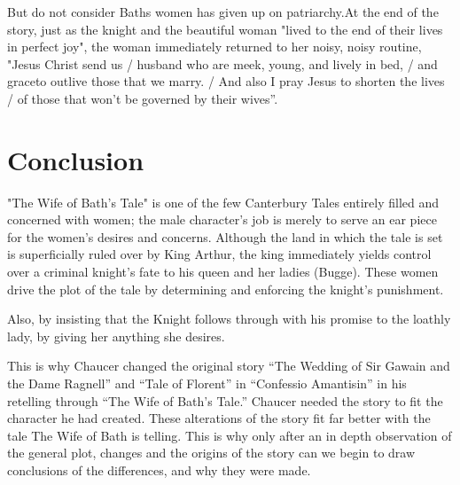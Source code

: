 But do not consider Baths women has given up on patriarchy.\cite{steinberg1964wife}At the end of the story, just as the knight and the beautiful woman "lived to the end of their lives in perfect joy", the woman immediately returned to her noisy, noisy routine, "Jesus Christ send us /  husband who are meek, young, and lively in bed, / and graceto outlive those that we marry. / And also I pray Jesus to shorten the lives / of those that won't be governed by their wives”.


\section{Conclusion}
\label{Conclusion}

"The Wife of Bath's Tale" is one of the few Canterbury Tales entirely filled and concerned with women; the male character's job is merely to serve an ear piece for the women's desires and concerns. Although the land in which the tale is set is superficially ruled over by King Arthur, the king immediately yields control over a criminal knight's fate to his queen and her ladies (Bugge). These women drive the plot of the tale by determining and enforcing the knight's punishment. 

Also, by insisting that the Knight follows through with his promise to the loathly lady, by giving her anything she desires.

This is why Chaucer changed the original story “The Wedding of Sir Gawain and the Dame Ragnell” and “Tale of Florent” in “Confessio Amantisin” in his retelling through “The Wife of Bath’s Tale.” Chaucer needed the story to fit the character he had created. These alterations of the story fit far better with the tale The Wife of Bath is telling. This is why only after an in depth observation of the general plot, changes and the origins of the story can we begin to draw conclusions of the differences, and why they were made.


